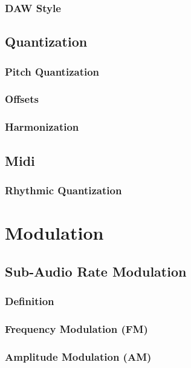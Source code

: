 \documentclass[11pt]{article}
\begin{document}
\subsubsection{DAW Style}
\label{sec:org6f0889b}
\subsection{Quantization}
\label{sec:org97d06ea}
\subsubsection{Pitch Quantization}
\label{sec:org9f80876}
\subsubsection{Offsets}
\label{sec:orgb5d015e}
\subsubsection{Harmonization}
\label{sec:orgf8d7d65}
\subsection{Midi}
\label{sec:orgd3d9aa5}
\subsubsection{Rhythmic Quantization}
\label{sec:org2f69b63}

\section{Modulation}
\label{sec:org982d055}
\subsection{Sub-Audio Rate Modulation}
\label{sec:org53b7821}
\subsubsection{Definition}
\label{sec:org808fa01}
\subsubsection{Frequency Modulation (FM)}
\label{sec:orgba513dd}
\subsubsection{Amplitude Modulation (AM)}
\label{sec:org4b4d991}
\end{document}
